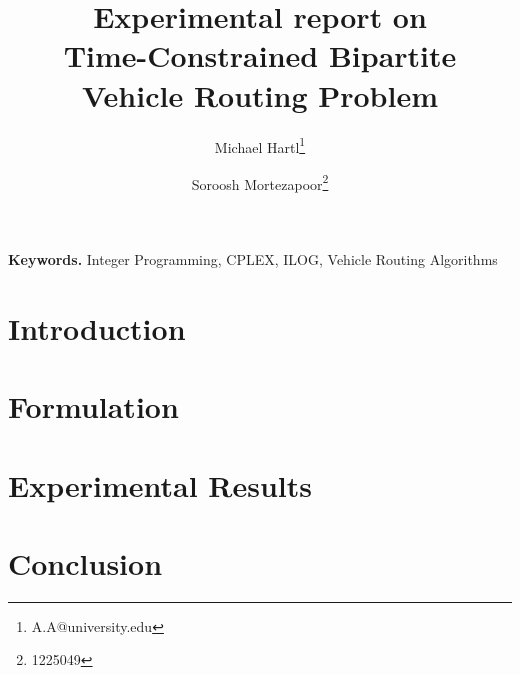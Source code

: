 \documentclass[twocolumn]{article}
\title{\vspace{-15mm}Experimental report on \vspace{5mm} \\
\fontsize{24pt}{10pt}\selectfont\textbf{Time-Constrained Bipartite Vehicle Routing Problem}}
\author[1]{Michael Hartl\thanks{A.A@university.edu}}
\author[1]{Soroosh Mortezapoor\thanks{1225049}}
\affil[1]{Vienna University of Technology}
\date{}
\begin{document}
\twocolumn[%
\maketitle %
\begin{abstract}

\end{abstract}
]



\thispagestyle{fancy} %








\smallskip
\noindent \textbf{Keywords.} Integer Programming, CPLEX, ILOG, Vehicle Routing
Algorithms




\section{Introduction}


\section{Formulation}


\section{Experimental Results}


\section{Conclusion}




 

\end{document}
